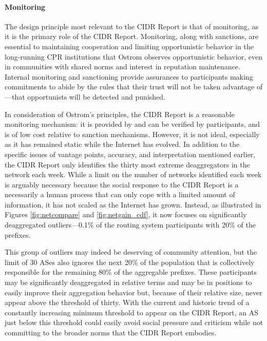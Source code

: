 \paragraph{Monitoring}
The design principle most relevant to the CIDR Report is that of monitoring, as
it is the primary role of the CIDR Report. Monitoring, along with sanctions,
are essential to maintaining cooperation and limiting opportunistic behavior in
the long-running CPR institutions that Ostrom observes opportunistic behavior,
even in communities with shared norms and interest in reputation maintenance.
Internal monitoring and sanctioning provide assurances to participants making
commitments to abide by the rules that their trust will not be taken advantage
of---that opportunists will be detected and punished.

In consideration of Ostrom's principles, the CIDR Report is a reasonable
monitoring mechanism: it is provided by and can be verified by participants,
and is of low cost relative to sanction mechanisms. However, it is not ideal,
especially as it has remained static while the Internet has evolved.  In
addition to the specific issues of vantage points, accuracy, and interpretation
mentioned earlier, the CIDR Report only identifies the thirty most extreme
deaggregators in the network each week. While a limit on the number of networks
identified each week is arguably necessary because the social response to the
CIDR Report is a necessarily a human process that can only cope with a limited
amount of information, it has not scaled as the Internet has grown. Instead, as
illustrated in Figures \ref{fig:netcompare} and \ref{fig:netgain_cdf}, it now
focuses on significantly deaggregated outliers---0.1\% of the routing system
participants with 20\% of the prefixes.

This group of outliers may indeed be deserving of community attention, but the
limit of 30 ASes also ignores the next 20\% of the population that is
collectively responsible for the remaining 80\% of the aggregable prefixes.
These participants may be significantly deaggregated in relative terms and may
be in positions to easily improve their aggregation behavior but, because of
their relative size, never appear above the threshold of thirty. With the
current and historic trend of a constantly increasing minimum threshold to
appear on the CIDR Report, an AS just below this threshold could easily avoid
social pressure and criticism while not committing to the broader norms that
the CIDR Report embodies.

